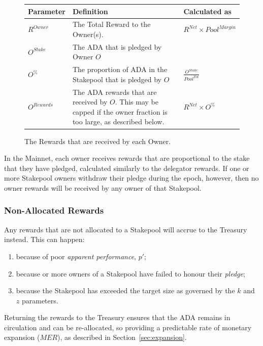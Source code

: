 \documentclass[11pt,a4paper,dvipsnames,twosided,final]{article}
\newcommand{\ada}{ADA{}}
\begin{document}
\begin{figure}[h!]
\begin{center}
\begin{tabular}{||l|p{9cm}|l||}
  \hline \hline
\textbf{Parameter}  & \textbf{Definition} & \textbf{Calculated as} \\\hline
$R^\textit{Owner}$ & The Total Reward to the Owner(s).  & $R^{\textit{Net}} \times {\textit{Pool}}^{\textit{Margin}}$ \\\hline
$O^\textit{Stake}$ & The \ada{} that is pledged by Owner $O$ & \\\hline
$O^\%$ & The proportion of \ada{} in the Stakepool that is pledged by $O$ & $\frac{O^{Stake}}{Pool^{Tot}}$ \\\hline
$O^{Rewards}$ & The \ada{} rewards that are received by $O$. This may be capped if the owner fraction is too large,
as described below. & $R^{\textit{Net}} \times O^\%$ \\\hline
\hline
\end{tabular}
\end{center}
\caption{The Rewards that are received by each Owner.}
\end{figure}

\noindent
In the Mainnet, each owner receives rewards that are proportional to the stake that they have pledged,
calculated similarly to the delegator rewards.  If one or more Stakepool owners withdraw their pledge during the epoch,
however, then no owner rewards will be received by any owner of that Stakepool.

\subsubsection*{Non-Allocated Rewards}

Any rewards that are not allocated to a Stakepool will accrue to the Treasury instead.  This can happen:

\begin{enumerate}[i]
\item
  because of poor \emph{apparent performance}, $p'$;
\item
  because or more owners of a Stakepool have failed to honour their \emph{pledge};
\item
  because the Stakepool has exceeded the target size as governed by the $k$ and $z$ parameters.
\end{enumerate}

\noindent
Returning the rewards to the Treasury ensures that the \ada{} remains in circulation and can be re-allocated, so providing a predictable rate
of monetary expansion ($\textit{MER}$), as described in Section~\ref{sec:expansion}.
\end{document}
